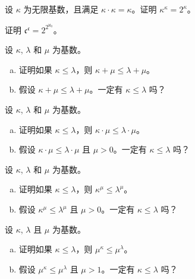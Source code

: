 \begin{chapex}
设 $\kappa$ 为无限基数，且满足 $\kappa \cdot \kappa = \kappa$。证明 $\kappa^{\kappa} = 2^{\kappa}$。
\end{chapex}

\begin{chapex}
证明 $\mathfrak{c}^{\mathfrak{c}} = 2^{2^{\aleph_0}}$。
\end{chapex}

\begin{chapex}
设 $\kappa$, $\lambda$ 和 $\mu$ 为基数。
\begin{enumerate}[(a)]
\item 证明如果 $\kappa \le \lambda$，则 $\kappa + \mu \le \lambda + \mu$。
\item 假设 $\kappa + \mu \le \lambda + \mu$。一定有 $\kappa \le \lambda$ 吗？
\end{enumerate}
\end{chapex}

\begin{chapex}
设 $\kappa$, $\lambda$ 和 $\mu$ 为基数。
\begin{enumerate}[(a)]
\item 证明如果 $\kappa \le \lambda$，则 $\kappa \cdot \mu \le \lambda \cdot \mu$。
\item 假设 $\kappa \cdot \mu \le \lambda \cdot \mu$ 且 $\mu > 0$。一定有 $\kappa \le \lambda$ 吗？
\end{enumerate}
\end{chapex}

\begin{chapex}
设 $\kappa$, $\lambda$ 和 $\mu$ 为基数。
\begin{enumerate}[(a)]
\item 证明如果 $\kappa \le \lambda$，则 $\kappa^{\mu} \le \lambda^{\mu}$。
\item 假设 $\kappa^{\mu} \le \lambda^{\mu}$ 且 $\mu > 0$。一定有 $\kappa \le \lambda$ 吗？
\end{enumerate}
\end{chapex}

\begin{chapex}
设 $\kappa$, $\lambda$ 且 $\mu$ 为基数。
\begin{enumerate}[(a)]
\item 证明如果 $\kappa \le \lambda$，则 $\mu^{\kappa} \le \mu^{\lambda}$。
\item 假设 $\mu^{\kappa} \le \mu^{\lambda}$ 且 $\mu > 1$。一定有 $\kappa \le \lambda$ 吗？
\end{enumerate}
\end{chapex}

